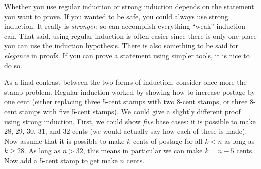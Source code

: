 \documentclass[12pt]{article}
\begin{document}
Whether you use regular induction or strong induction depends on the statement you want to prove.  If you wanted to be safe, you could always use strong induction.  It really is \emph{stronger}, so can accomplish everything ``weak'' induction can.  That said, using regular induction is often easier since there is only one place you can use the induction hypothesis.  There is also something to be said for \emph{elegance} in proofs.  If you can prove a statement using simpler tools, it is nice to do so.

As a final contrast between the two forms of induction, consider once more the stamp problem.  Regular induction worked by showing how to increase postage by one cent (either replacing three 5-cent stamps with two 8-cent stamps, or three 8-cent stamps with five 5-cent stamps).  We could give a slightly different proof using strong induction.  First, we could show \emph{five} base cases: it is possible to make 28, 29, 30, 31, and 32 cents (we would actually say how each of these is made).  Now assume that it is possible to make $k$ cents of postage for all $k < n$ as long as $k \ge 28$.  As long as $n > 32$, this means in particular we can make $k = n-5$ cents.  Now add a 5-cent stamp to get make $n$ cents.
\end{document}
